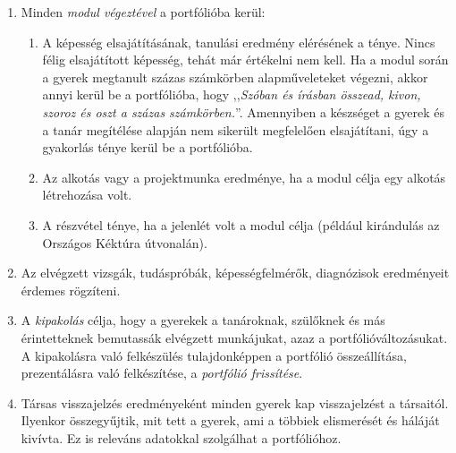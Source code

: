 \begin{enumerate}
      \item Minden \emph{modul végeztével} a portfólióba kerül:

            \begin{enumerate}

                  \item  A képesség elsajátításának, tanulási eredmény
                        elérésének a ténye.
                        Nincs
                        félig elsajátított képesség, tehát már értékelni nem
                        kell. Ha a modul során a gyerek megtanult százas
                        számkörben alapműveleteket
                        végezni, 
                        akkor
                        annyi kerül be a portfólióba, hogy ,,\emph{Szóban és
                              írásban
                              összead, kivon, szoroz és oszt a százas
                              számkörben.}''. Amennyiben a
                        készséget a
                        gyerek és a
                        tanár megítélése alapján nem sikerült megfelelően
                        elsajátítani,
                        úgy a gyakorlás
                        ténye kerül be a portfólióba.
                  \item Az alkotás vagy a projektmunka eredménye, ha a modul
                        célja egy
                        alkotás
                        létrehozása volt.
                  \item A részvétel ténye, ha a jelenlét volt a modul célja
                        (például
                        kirándulás
                        az Országos Kéktúra útvonalán).

            \end{enumerate}
      \item Az elvégzett vizsgák, tudáspróbák, képességfelmérők, diagnózisok
            eredményeit érdemes rögzíteni.

      \item A \emph{kipakolás} célja, hogy a gyerekek a tanároknak, szülőknek
            és
            más érintetteknek bemutassák elvégzett
            munkájukat, azaz
            a portfólióváltozásukat. A kipakolásra való felkészülés
            tulajdonképpen
            a
            portfólió összeállítása, prezentálásra való felkészítése, a
            \emph{portfólió
                  frissítése}.

      \item Társas visszajelzés eredményeként minden gyerek kap visszajelzést a
            társaitól. Ilyenkor összegyűjtik, mit tett a gyerek, ami a többiek
            elismerését
            és háláját kivívta. Ez is releváns adatokkal szolgálhat a
            portfólióhoz.


\end{enumerate}
